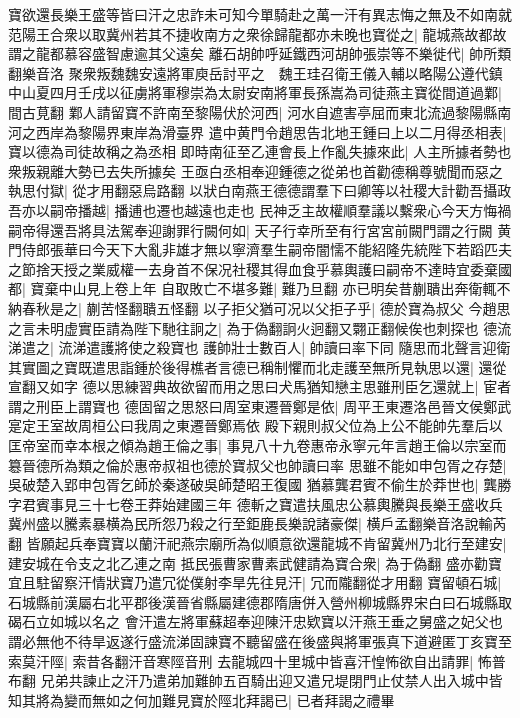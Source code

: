 寶欲還長樂王盛等皆曰汗之忠詐未可知今單騎赴之萬一汗有異志悔之無及不如南就范陽王合衆以取冀州若其不捷收南方之衆徐歸龍都亦未晚也寶從之|{
	龍城燕故都故謂之龍都慕容盛智慮逾其父遠矣}
離石胡帥呼延鐵西河胡帥張崇等不樂徙代|{
	帥所類翻樂音洛}
聚衆叛魏魏安遠將軍庾岳討平之　魏王珪召衛王儀入輔以略陽公遵代鎮中山夏四月壬戌以征虜將軍穆崇為太尉安南將軍長孫嵩為司徒燕主寶從間道過鄴|{
	間古莧翻}
鄴人請留寶不許南至黎陽伏於河西|{
	河水自遮害亭屈而東北流過黎陽縣南河之西岸為黎陽界東岸為滑臺界}
遣中黄門令趙思告北地王鍾曰上以二月得丞相表|{
	寶以德為司徒故稱之為丞相}
即時南征至乙連會長上作亂失據來此|{
	人主所據者勢也衆叛親離大勢已去失所據矣}
王亟白丞相奉迎鍾德之從弟也首勸德稱尊號聞而惡之執思付獄|{
	從才用翻惡烏路翻}
以狀白南燕王德德謂羣下曰卿等以社稷大計勸吾攝政吾亦以嗣帝播越|{
	播逋也遷也越遠也走也}
民神乏主故權順羣議以繫衆心今天方悔禍嗣帝得還吾將具法駕奉迎謝罪行闕何如|{
	天子行幸所至有行宮宮前闕門謂之行闕}
黄門侍郎張華曰今天下大亂非雄才無以寧濟羣生嗣帝闇懦不能紹隆先統陛下若蹈匹夫之節捨天授之業威權一去身首不保况社稷其得血食乎慕輿護曰嗣帝不達時宜委棄國都|{
	寶棄中山見上卷上年}
自取敗亡不堪多難|{
	難乃旦翻}
亦已明矣昔蒯聵出奔衛輒不納春秋是之|{
	蒯苦怪翻聵五怪翻}
以子拒父猶可况以父拒子乎|{
	德於寶為叔父}
今趙思之言未明虚實臣請為陛下馳往詗之|{
	為于偽翻詗火迥翻又翾正翻候俟也刺探也}
德流涕遣之|{
	流涕遣護將使之殺寶也}
護帥壯士數百人|{
	帥讀曰率下同}
隨思而北聲言迎衛其實圖之寶既遣思詣鍾於後得樵者言德已稱制懼而北走護至無所見執思以還|{
	還從宣翻又如字}
德以思練習典故欲留而用之思曰犬馬猶知戀主思雖刑臣乞還就上|{
	宦者謂之刑臣上謂寶也}
德固留之思怒曰周室東遷晉鄭是依|{
	周平王東遷洛邑晉文侯鄭武寔定王室故周桓公曰我周之東遷晉鄭焉依}
殿下親則叔父位為上公不能帥先羣后以匡帝室而幸本根之傾為趙王倫之事|{
	事見八十九卷惠帝永寧元年言趙王倫以宗室而簒晉德所為類之倫於惠帝叔祖也德於寶叔父也帥讀曰率}
思雖不能如申包胥之存楚|{
	吳破楚入郢申包胥乞師於秦遂破吳師楚昭王復國}
猶慕龔君賓不偷生於莽世也|{
	龔勝字君賓事見三十七卷王莽始建國三年}
德斬之寶遣扶風忠公慕輿騰與長樂王盛收兵冀州盛以騰素暴横為民所怨乃殺之行至鉅鹿長樂說諸豪傑|{
	横戶孟翻樂音洛說輸芮翻}
皆願起兵奉寶寶以蘭汗祀燕宗廟所為似順意欲還龍城不肯留冀州乃北行至建安|{
	建安城在令支之北乙連之南}
抵民張曹家曹素武健請為寶合衆|{
	為于偽翻}
盛亦勸寶宜且駐留察汗情狀寶乃遣冗從僕射李旱先往見汗|{
	冗而隴翻從才用翻}
寶留頓石城|{
	石城縣前漢屬右北平郡後漢晉省縣屬建德郡隋唐併入營州柳城縣界宋白曰石城縣取碣石立如城以名之}
會汗遣左將軍蘇超奉迎陳汗忠欵寶以汗燕王垂之舅盛之妃父也謂必無他不待旱返遂行盛流涕固諫寶不聽留盛在後盛與將軍張真下道避匿丁亥寶至索莫汗陘|{
	索昔各翻汗音寒陘音刑}
去龍城四十里城中皆喜汗惶怖欲自出請罪|{
	怖普布翻}
兄弟共諫止之汗乃遣弟加難帥五百騎出迎又遣兄堤閉門止仗禁人出入城中皆知其將為變而無如之何加難見寶於陘北拜謁已|{
	已者拜謁之禮畢}
